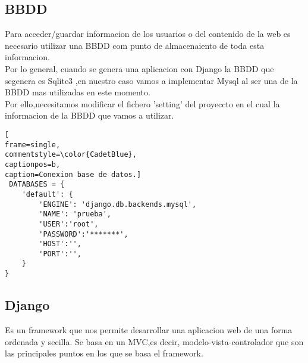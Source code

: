 \subsection{BBDD}
Para acceder/guardar informacion de los usuarios o del contenido de la web es necesario utilizar una BBDD com punto de almacenaiento de toda esta informacion.
\\Por lo general, cuando se genera una aplicacion con Django la BBDD que segenera es Sqlite3 ,en nuestro caso vamos a implementar Mysql al ser una de la BBDD mas utilizadas en este momento.
\\Por ello,necesitamos modificar el fichero 'setting' del proyeccto en el cual la informacion de  la BBDD que vamos a utilizar.
\begin{lstlisting}[
frame=single,
commentstyle=\color{CadetBlue},
captionpos=b,
caption=Conexion base de datos.]
 DATABASES = {
    'default': {
        'ENGINE': 'django.db.backends.mysql',
        'NAME': 'prueba',
        'USER':'root',
        'PASSWORD':'*******',
        'HOST':'',
        'PORT':'',
    }
}
\end{lstlisting}
\subsection{Django}
Es un framework que nos permite desarrollar una aplicacion web de una forma ordenada y secilla. Se basa en un MVC,es decir, modelo-vista-controlador que son las principales puntos en los que se basa el framework.
